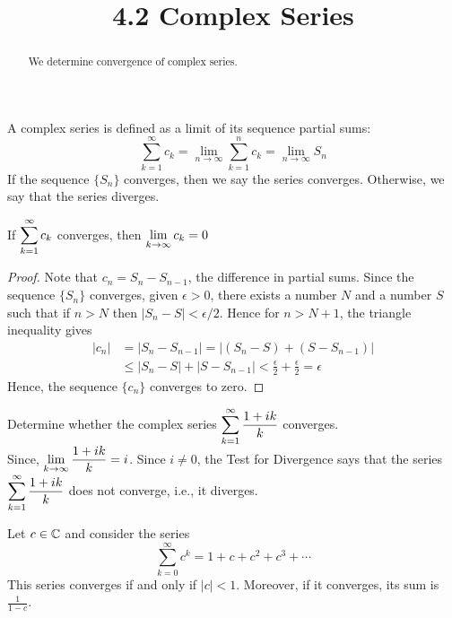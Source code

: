 \documentclass[handout]{ximera}
\title{4.2 Complex Series}
\begin{document}
\begin{abstract}
We determine convergence of complex series.
\end{abstract}

\maketitle


\begin{definition} 
A complex series  is defined as a limit of its sequence partial sums:
\[
\sum_{k=1}^\infty c_k = \lim_{n \to \infty}  \sum_{k=1}^n c_k = \lim_{n \to \infty} S_n
\]
If the sequence $\{S_n\}$ converges, then we say the series converges.  Otherwise, we say that the series diverges. 
\end{definition}

\begin{theorem}
If $\displaystyle \sum_{k=1}^\infty c_k$ converges, then $\displaystyle \lim_{k\to\infty} c_k = 0$
\end{theorem}
\begin{proof}
Note that $c_n = S_n - S_{n-1}$, the difference in partial sums. Since the sequence $\{S_n\}$ converges, given $\epsilon >0$,
there exists a number $N$ and a number $S$ such that if $n>N$ then $|S_n - S| < \epsilon/2$. Hence for $n > N+1$, the triangle inequality gives
\begin{align*}
|c_n| &= |S_n - S_{n-1}| = |(S_n -S) + (S-S_{n-1})| \\
&\leq |S_n -S| + |S-S_{n-1}| < \frac{\epsilon}{2} + \frac{\epsilon}{2} =\epsilon
\end{align*}
Hence, the sequence $\{c_n\}$ converges to zero.
\end{proof}


\begin{example}[example 1] 
Determine whether the complex series $\displaystyle \sum_{k=1}^\infty \frac{1+ik}{k}$ converges.\\
Since, $\displaystyle \lim_{k \to \infty} \frac{1+ik}{k} = i$. Since $i \neq 0$, the Test for Divergence says that the series $\displaystyle \sum_{k=1}^\infty \frac{1+ik}{k}$
does not converge, i.e., it diverges.
\end{example}


\begin{theorem}
Let $c \in \mathbb C$ and consider the series
\[
\sum_{k=0}^\infty c^k = 1 + c + c^2 + c^3 + \cdots
\]
This series converges if and only if $|c| < 1$.  Moreover, if it converges, its sum is 
$\displaystyle \frac{1}{1-c}$.
\end{theorem}
\end{document}
